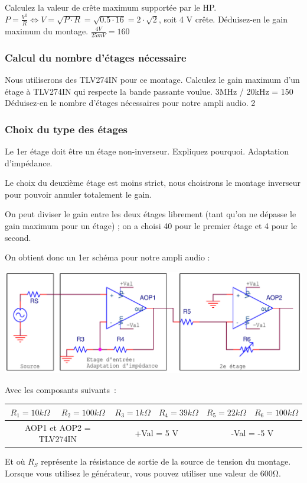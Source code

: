 \documentclass{../template/labo}
\begin{document}
\Question
{
Calculez la valeur de crête maximum supportée par le HP.
}
{$P = \frac{V^2}{R} \Leftrightarrow V = \sqrt{P \cdot R} = \sqrt{0.5 \cdot 16} = 2\cdot \sqrt{2}$, soit 4 V crête.}
\Question
{
Déduisez-en le gain maximum du montage.
}
{$\frac{4 V}{25 mV} = 160$}

\subsubsection{Calcul du nombre d'étages nécessaire}
Nous utiliserons des TLV274IN pour ce montage.
\Question
{
Calculez le gain maximum d'un étage à TLV274IN qui respecte la bande passante voulue.
}
{3MHz / 20kHz = 150}
\Question
{
Déduisez-en le nombre d'étages nécessaires pour notre ampli audio.
}
{2}


\subsubsection{Choix du type des étages}
\Question
{
Le 1er étage doit être un étage non-inverseur. Expliquez pourquoi.
}
{Adaptation d'impédance.}

Le choix du deuxième étage est moins strict, nous choisirons le montage inverseur pour pouvoir annuler totalement le gain.

On peut diviser le gain entre les deux étages librement (tant qu'on ne dépasse le gain maximum pour un étage) ; on a choisi 40 pour le premier étage et 4 pour le second.

On obtient donc un 1er schéma pour notre ampli audio :
\begin{center}
\includegraphics[width=14cm]{figures/AOP2etages.png}
\end{center}
Avec les composants suivants~:
\begin{center}
\begin{tabular}{|c||c||c||c||c||c|}\hline
$R_1 = 10 k\Omega$ & $R_2 = 100 k\Omega$ & $R_3 = 1 k\Omega$ & $R_4 = 39 k\Omega$ & $R_5 = 22 k\Omega$ & $R_6 = 100 k\Omega$ \\ \hline
\multicolumn{2}{|c||}{AOP1 et AOP2 = TLV274IN} & \multicolumn{2}{c||}{+Val = 5 V} & \multicolumn{2}{c|}{-Val = -5 V} \\ \hline
\end{tabular}
\end{center}
Et où $R_S$ représente la résistance de sortie de la source de tension du montage. Lorsque vous utilisez le générateur, vous pouvez utiliser une valeur de $600 \si{\ohm}$.
\end{document}
